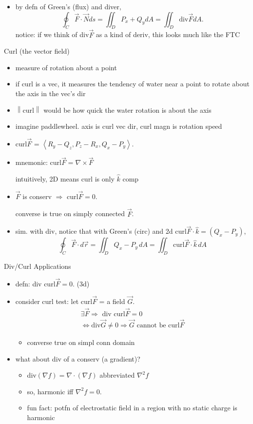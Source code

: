 \documentclass[11pt]{article}
\theoremstyle{definition}
\newcommand{\col}[1]{\begin{minipage}{\columnwidth}#1\end{minipage}}
\newcommand{\magn}[1]{\left\lVert #1 \right\rVert}
\begin{document}
\begin{multicols}{2}
{\begin{itemize}
      converse is true on simply connected $\vec{F}$.
      \item by defn of Green's (flux) and diver,
      \[\oint_C \vec{F}\cdot\vec{N}ds = \iint_D P_x+Q_ydA=\iint_D \text{div}\vec{F}dA.\]
      notice: if we think of div$\vec{F}$ as a kind of deriv, this looks much like the FTC
    \end{itemize}
  }
  \col{
    Curl (the vector field)
    \begin{itemize}
      \item measure of rotation about a point
      \item if curl is a vec, it measures the tendency of water near a point to rotate about the axis in the vec's dir
      \item $\magn{\text{curl}}$ would be how quick the water rotation is about the axis
      \item imagine paddlewheel. axis is curl vec dir, curl magn is rotation speed
      \item \raggedright curl$\vec{F}$ = $\left<R_y-Q_z,P_z-R_x,Q_x-P_y\right>$.
      \item mnemonic: curl$\vec{F}=\nabla\times\vec{F}$
      
      intuitively, 2D means curl is only $\hat{k}$ comp
      \item $\vec{F}$ is conserv $\Rightarrow$ curl$\vec{F} = 0$.
      
      converse is true on simply connected $\vec{F}$.
      \item sim. with div, notice that with Green's (circ) and 2d curl$\vec{F}\cdot\hat{k} = (Q_x-P_y)$,
      \[\oint_C \vec{F}\cdot d\vec{r} = \iint_D Q_x-P_y \,dA = \iint_D \text{curl}\vec{F}\cdot\hat{k}\,dA\]
    \end{itemize}
    Div/Curl Applications
    \begin{itemize}
      \item defn: div curl$\vec{F} = 0$. (3d)
      \item consider curl test: let curl$\vec{F}$ = a field $\vec{G}$.
      \begin{gather*}
        \exists \vec{F}\Rightarrow\text{ div curl}\vec{F} = 0 \\
        \iff \text{div}\vec{G}\ne 0 \Rightarrow\vec{G} \text{ cannot be curl}\vec{F}
      \end{gather*}
      \begin{itemize}
        \item converse true on simpl conn domain
      \end{itemize}
      \item what about div of a conserv (a gradient)?
      \begin{itemize}
        \item div$(\nabla f) = \nabla\cdot(\nabla f)$ abbreviated $\nabla^2 f$
        \item so, harmonic iff $\nabla ^2 f = 0$.
        \item fun fact: potfn of electrostatic field in a region with no static charge is harmonic
      \end{itemize}
    \end{itemize}
  }
\end{multicols}
\end{document}
